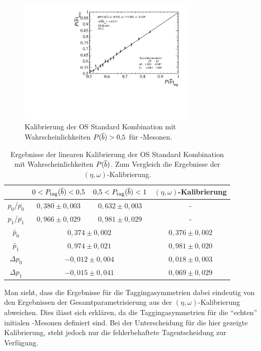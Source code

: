  \begin{figure}[htbp]
	\centering
		\includegraphics[width=0.75\textwidth]{fig/calibration_B.pdf}
	\caption{Kalibrierung der OS Standard Kombination mit Wahrscheinlichkeiten \mbox{$P({\overline {{b}}})>0{,}5$} für \Bz-Mesonen.}
	\label{fig:PBgetrennt2} 
\end{figure} 
\begin{table}[htbp]
	\centering
	\caption{Ergebnisse der linearen Kalibrierung der OS Standard Kombination mit Wahrscheinlichkeiten $P({\overline {{b}}})$. Zum Vergleich die Ergebnisse der $(\eta,\omega)$-Kalibrierung.}
	\label{tab:PBgetrennt} 
	\begin{tabular}{c|ccc}
	\toprule
	 & $0<P_\text{tag}({\overline {{b}}})<0{,}5$ & $0{,}5<P_\text{tag}({\overline {{b}}})<1$ & $(\eta,\omega)$-Kalibrierung \\ 
	 \midrule
      $p_0$/$\overline{p_0}$  & $0{,}380\pm0{,}003$ & $0{,}632\pm0{,}003$ & - \\  
      $p_1$/$\overline{p_1}$ & $0{,}966\pm0{,}029$ & $0{,}981\pm0{,}029$ & - \\
      $\widetilde{p_0}$ & \multicolumn{2}{c}{$0{,}374\pm0{,}002$} &  $0{,}376\pm0{,}002$ \\
      $\widetilde{p_1}$ &  \multicolumn{2}{c}{$0{,}974\pm0{,}021$} &  $0{,}981\pm0{,}020$ \\
      $\Delta p_0$ & \multicolumn{2}{c}{$-0{,}012\pm0{,}004$} &  $0{,}018\pm0{,}003$ \\
      $\Delta p_1$ & \multicolumn{2}{c}{$-0{,}015\pm0{,}041$} &  $0{,}069\pm0{,}029$ \\ 
      \bottomrule
	\end{tabular}
\end{table}
Man sieht, dass die Ergebnisse für die Taggingasymmetrien dabei eindeutig von den Ergebnissen der Gesamtparametrisierung aus der $(\eta,\omega)$-Kalibrierung abweichen. Dies ilässt sich erklären, da die Taggingasymmetrien für die \enquote{echten} initialen \B-Mesonen definiert sind. Bei der Unterscheidung für die hier gezeigte Kalibrierung, steht jedoch nur die fehlerbehaftete Tagentscheidung zur Verfügung.\\ 
